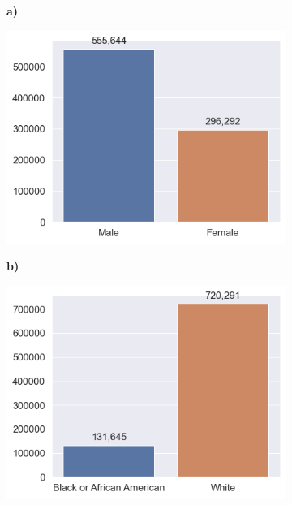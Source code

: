\begin{figure}[!htbp]
    \begin{minipage}[b]{0.5\textwidth}
        \centering
        \begin{subfigure}[t]{0.06\textwidth}
            \textbf{a)}
        \end{subfigure}
        \begin{subfigure}[t]{0.9\textwidth}
            \includegraphics[width=\linewidth, valign=t]{images/HMDA_features/HMDA_features_sex.png}
        \end{subfigure}
    \end{minipage}%
    \begin{minipage}[b]{0.5\textwidth}
        \centering
        \begin{subfigure}[t]{0.06\textwidth}
            \textbf{b)}
        \end{subfigure}
        \begin{subfigure}[t]{0.9\textwidth}
            \includegraphics[width=\linewidth, valign=t]{images/HMDA_features/HMDA_features_race.png}

\end{subfigure}
\end{minipage}
\end{figure}

